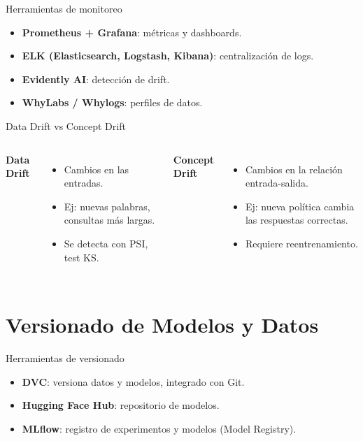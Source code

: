 \documentclass[aspectratio=169, 10pt, xcolor=table]{beamer}
\begin{document}
\begin{frame}{Herramientas de monitoreo}
    \begin{itemize}
        \item \textbf{Prometheus + Grafana}: métricas y dashboards.
        \item \textbf{ELK (Elasticsearch, Logstash, Kibana)}: centralización de logs.
        \item \textbf{Evidently AI}: detección de drift.
        \item \textbf{WhyLabs / Whylogs}: perfiles de datos.
    \end{itemize}
\end{frame}

\begin{frame}{Data Drift vs Concept Drift}
    \begin{columns}[t]
        \textbf{Data Drift}
        \begin{itemize}
            \item Cambios en las entradas.
            \item Ej: nuevas palabras, consultas más largas.
            \item Se detecta con PSI, test KS.
        \end{itemize}
        \textbf{Concept Drift}
        \begin{itemize}
            \item Cambios en la relación entrada-salida.
            \item Ej: nueva política cambia las respuestas correctas.
            \item Requiere reentrenamiento.
        \end{itemize}
    \end{columns}
\end{frame}

\section{Versionado de Modelos y Datos}

\begin{frame}{Herramientas de versionado}
    \begin{itemize}
        \item \textbf{DVC}: versiona datos y modelos, integrado con Git.
        \item \textbf{Hugging Face Hub}: repositorio de modelos.
        \item \textbf{MLflow}: registro de experimentos y modelos (Model Registry).
    \end{itemize}
\end{frame}
\end{document}
